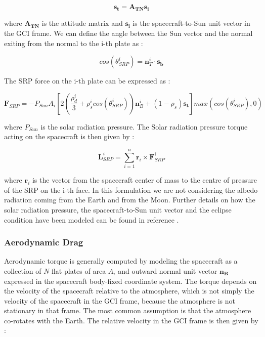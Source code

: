 \begin{equation}
  \mathbf{s_t} = \mathbf{A_{TN}} \mathbf{s_i}
\end{equation}

where $\mathbf{A_{TN}}$ is the attitude matrix and $\mathbf{s_i}$ is the spacecraft-to-Sun unit vector in the GCI frame.
We can define the angle between the Sun vector and the normal exiting from the normal to the i-th plate as :

\begin{equation}
  cos(\theta_{SRP}^{i}) = \mathbf{n}_{T}^{i} \cdot \mathbf{s_b}
\end{equation}

The SRP force on the i-th plate can be expressed as :

\begin{equation}
  \mathbf{F}_{SRP} = - P_{Sun}A_{i}\left[ 2\left( \frac{\rho_{d}^{i}}{3} + \rho_{s}^{i}cos(\theta_{SRP}^{i}) \right) \mathbf{n}_{B}^{i} + (1 -\rho_{s}) \mathbf{s_t} \right] max(cos(\theta_{SRP}^{i}),0)
\end{equation}

where $P_{Sun}$ is the solar radiation pressure.
The Solar radiation pressure torque acting on the spacecraft is then given by :

\begin{equation}
  \mathbf{L}_{SRP}^{i} = \sum\limits_{i=1}^n  \mathbf{r}_{i} \times \mathbf{F}_{SRP}^{i}
\end{equation}

where $\mathbf{r}_{i}$ is the vector from the spacecraft center of mass to the centre of pressure of the SRP on the i-th face.
In this formulation we are not considering the albedo radiation coming from the Earth and from the Moon.
Further details on how the solar radiation pressure, the spacecraft-to-Sun unit vector and the eclipse condition have been modeled can be found in reference \cite{Markley2014}.

\subsubsection{Aerodynamic Drag}
Aerodynamic torque is generally computed by modeling the spacecraft as a collection of $N$ flat plates of area $A_i$ and outward normal unit vector $\mathbf{n_{B}}$ expressed in the spacecraft body-fixed coordinate system. The torque depends on the velocity of the spacecraft relative to the atmosphere, which is not simply the velocity of the spacecraft in the GCI frame, because the atmosphere is not stationary in that frame.
The most common assumption is that the atmosphere co-rotates with the Earth. The relative velocity in the GCI frame is then given by :

